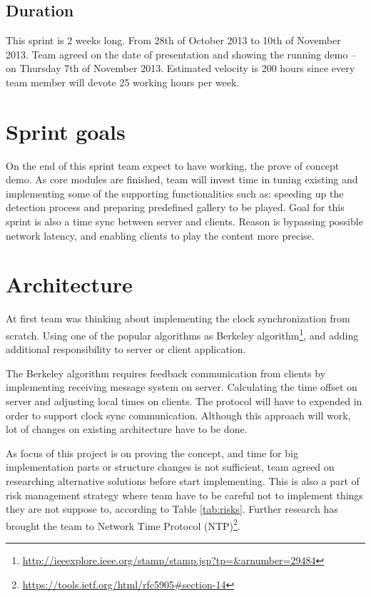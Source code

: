 

\subsection{Duration}
This sprint is 2 weeks long. From 28th of October 2013 to 10th of November 2013. 
Team agreed on the date of presentation and showing the running demo – on Thursday 7th of November 2013.
Estimated velocity is 200 hours since every team member will devote 25 working hours per week.


\section{Sprint goals}

On the end of this sprint team expect to have working, the prove of concept demo. As core modules are finished, team will invest time in tuning existing and implementing some of the supporting functionalities such as: speeding up the detection process  and preparing predefined gallery to be played. Goal for this sprint is also a time sync between server and clients. Reason is bypassing possible network latency, and enabling clients to play the content more precise. 

\section{Architecture}

At first team was thinking about implementing the clock synchronization from scratch. Using one of the popular algorithms as Berkeley algorithm\footnote{\url{http://ieeexplore.ieee.org/stamp/stamp.jsp?tp=\&arnumber=29484}}, and adding additional responsibility to server or client application. 

The Berkeley algorithm requires feedback communication from clients by implementing receiving message system on server. Calculating the time offset on server and adjusting local times on clients. The protocol will have to expended in order to support clock sync communication. Although this approach will work, lot of changes on existing architecture have to be done.

As focus of this project is on proving the concept, and time for big implementation parts or structure changes is not sufficient, team agreed on researching alternative solutions before start implementing. This is also a part of risk management strategy where team have to be careful not to implement things they are not suppose to, according to Table \ref{tab:risks}. Further research has brought the team to Network Time Protocol (NTP)\footnote{\url{https://tools.ietf.org/html/rfc5905\#section-14}}.

